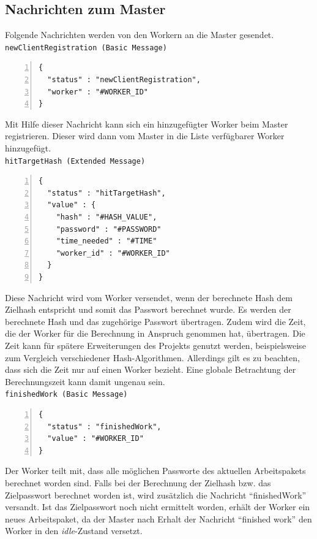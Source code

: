 \pagebreak

\subsection{Nachrichten zum Master}
Folgende Nachrichten werden von den Workern an die Master gesendet. \\

\texttt{newClientRegistration (Basic Message)}
\begin{lstlisting}[basicstyle=\ttfamily,numbers=left,numberstyle=\footnotesize\ttfamily,backgroundcolor=\color{sourcegray}]
{
  "status" : "newClientRegistration",
  "worker" : "#WORKER_ID"
}
\end{lstlisting}
Mit Hilfe dieser Nachricht kann sich ein hinzugefügter Worker beim Master registrieren. Dieser wird dann vom Master in die Liste verfügbarer Worker hinzugefügt.\\

\texttt{hitTargetHash (Extended Message)}
\begin{lstlisting}[basicstyle=\ttfamily,numbers=left,numberstyle=\footnotesize\ttfamily,backgroundcolor=\color{sourcegray}]
{
  "status" : "hitTargetHash",
  "value" : {
    "hash" : "#HASH_VALUE",
    "password" : "#PASSWORD"
    "time_needed" : "#TIME"
    "worker_id" : "#WORKER_ID"
  }
}\end{lstlisting}
Diese Nachricht wird vom Worker versendet, wenn der berechnete Hash dem Zielhash entspricht und somit das Passwort berechnet wurde. Es werden der berechnete Hash und das zugehörige Passwort übertragen. Zudem wird die Zeit, die der Worker für die Berechnung in Anspruch genommen hat, übertragen. Die Zeit kann für spätere Erweiterungen des Projekts genutzt werden, beispielsweise zum Vergleich verschiedener Hash-Algorithmen. Allerdings gilt es zu beachten, dass sich die Zeit nur auf einen Worker bezieht. Eine globale Betrachtung der Berechnungszeit kann damit ungenau sein. \\

\texttt{finishedWork (Basic Message)}
\begin{lstlisting}[basicstyle=\ttfamily,numbers=left,numberstyle=\footnotesize\ttfamily,backgroundcolor=\color{sourcegray}]
{
  "status" : "finishedWork",
  "value" : "#WORKER_ID"
}
\end{lstlisting}
Der Worker teilt mit, dass alle möglichen Passworte des aktuellen Arbeitspakets berechnet worden sind. Falls bei der Berechnung der Zielhash bzw. das Zielpasswort berechnet worden ist, wird zusätzlich die Nachricht \enquote{finishedWork} versandt. Ist das Zielpasswort noch nicht ermittelt worden, erhält der Worker ein neues Arbeitspaket, da der Master nach Erhalt der Nachricht \enquote{finished work} den Worker in den \emph{idle}-Zustand versetzt. \\


